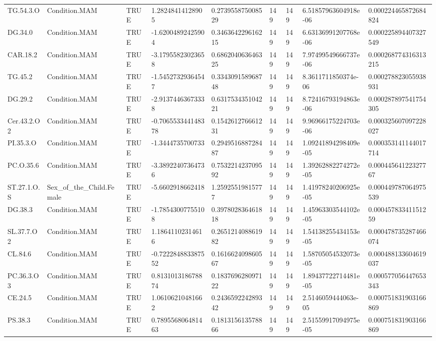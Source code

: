 \begin{longtable}{lllllllll}
TG.54.3.O & Condition.MAM & TRUE & 1.28248414128905 & 0.273955875008529 & 149 & 149 & 6.51857963604918e-06 & 0.000224465872684824 \\
DG.34.0 & Condition.MAM & TRUE & -1.62004892425904 & 0.346364229616215 & 149 & 149 & 6.63136991207768e-06 & 0.000225894407327549 \\
CAR.18.2 & Condition.MAM & TRUE & -3.17955823023658 & 0.686204063646325 & 149 & 149 & 7.97499549666737e-06 & 0.000268774316313215 \\
TG.45.2 & Condition.MAM & TRUE & -1.54527329364547 & 0.334309158968748 & 149 & 149 & 8.3611711850374e-06 & 0.000278823055938931 \\
DG.29.2 & Condition.MAM & TRUE & -2.91374463673338 & 0.631753435104221 & 149 & 149 & 8.72416793194863e-06 & 0.000287897541754305 \\
Cer.43.2.O2 & Condition.MAM & TRUE & -0.706553344148378 & 0.154261276661231 & 149 & 149 & 9.96966175224703e-06 & 0.000325607097228027 \\
PI.35.3.O & Condition.MAM & TRUE & -1.3444735700733 & 0.294951688728487 & 149 & 149 & 1.09241894298409e-05 & 0.000353141144017714 \\
PC.O.35.6 & Condition.MAM & TRUE & -3.38922407364736 & 0.753221423709592 & 149 & 149 & 1.39262882274272e-05 & 0.00044564122327767 \\
ST.27.1.O.S & Sex\_of\_the\_Child.Female & TRUE & -5.6602918662418 & 1.25925519815777 & 149 & 149 & 1.41978240206925e-05 & 0.000449787064975539 \\
DG.38.3 & Condition.MAM & TRUE & -1.78543007755108 & 0.397802836461818 & 149 & 149 & 1.45963303544102e-05 & 0.00045783341151259 \\
SL.37.7.O2 & Condition.MAM & TRUE & 1.18641102314616 & 0.265121408861982 & 149 & 149 & 1.54138255434153e-05 & 0.000478735287466074 \\
CL.84.6 & Condition.MAM & TRUE & -0.722284883387552 & 0.161662409860567 & 149 & 149 & 1.58705054532073e-05 & 0.000488133604619037 \\
PC.36.3.O3 & Condition.MAM & TRUE & 0.813101318678874 & 0.183769628097122 & 149 & 149 & 1.89437722714481e-05 & 0.000577056447653343 \\
CE.24.5 & Condition.MAM & TRUE & 1.06106210481662 & 0.243659224289342 & 149 & 149 & 2.5146059444063e-05 & 0.000751831903166869 \\
PS.38.3 & Condition.MAM & TRUE & 0.789556806481463 & 0.181315613578866 & 149 & 149 & 2.51559917094975e-05 & 0.000751831903166869 \\

\end{longtable}
